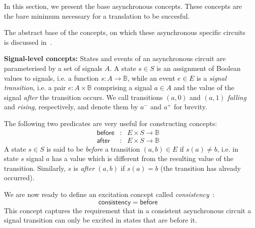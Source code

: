 \documentclass[british, journal]{IEEEtran}
\begin{document}

In this section, we present the base asynchronous concepts. These concepts are the 
bare minimum necessary for a translation to be succesful. 

The abstract base of the concepts, on which these asynchronous specific circuits
is discussed in~\cite{2015_Beaumont_MEMOCODE}.


\textbf{\label{signal-level}Signal-level concepts:} States and events of an
asynchronous
circuit are parameterised by a set of signals $A$. A state
$s\in S$ is an assignment of Boolean values to signals, i.e. a function
$s:A\rightarrow\mathbb{B}$, while an event $e\in E$ is a \emph{signal
transition}, i.e. a pair $e:A\times\mathbb{B}$ comprising a signal
$a\in A$ and the value of the signal \emph{after} the transition
occurs. We call transitions $(a,0)$ and $(a,1)$ \emph{falling} and
\emph{rising}, respectively, and denote them by $a^{-}$ and $a^{+}$
for brevity.

The following two predicates are very useful for constructing concepts:
\[
\begin{array}{ccc}
\mathsf{before} & \!\!\!\!:\!\!\!\!\! & E\times S\rightarrow\mathbb{B}\\
\mathsf{after} & \!\!\!\!:\!\!\!\!\! & E\times S\rightarrow\mathbb{B}
\end{array}
\]
A state $s\in S$ is said to be \emph{before} a transition $(a,b)\in E$
if $s(a)\neq b$, i.e. in state $s$ signal $a$ has a value which
is different from the resulting value of the transition. Similarly,
$s$ is \emph{after} $(a,b)$ if $s(a)=b$ (the transition has already
occurred).

We are now ready to define an excitation concept called
\emph{consistency}~\cite{Cortadella}:
\[
\mathsf{consistency}=\mathsf{before}
\]
This concept captures the requirement that in a consistent asynchronous
circuit a signal transition can only be excited in states that are
before it.
\end{document}
